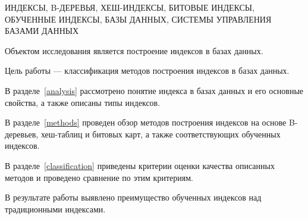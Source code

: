 \begin{essay}{}
    \noindent\mbox{ИНДЕКСЫ,} \mbox{B-ДЕРЕВЬЯ,} \mbox{ХЕШ-ИНДЕКСЫ,}
    \mbox{БИТОВЫЕ} \mbox{ИНДЕКСЫ,} \mbox{ОБУЧЕННЫЕ} \mbox{ИНДЕКСЫ,} \mbox{БАЗЫ}
    \mbox{ДАННЫХ,} \mbox{СИСТЕМЫ} \mbox{УПРАВЛЕНИЯ} \mbox{БАЗАМИ} \mbox{ДАННЫХ}

    Объектом исследования является построение индексов в базах данных.

    Цель работы --- классификация методов построения индексов в базах данных.

    В разделе~\ref{analysis} рассмотрено понятие индекса в базах данных и его
    основные свойства, а также описаны типы индексов.

    В разделе~\ref{methods} проведен обзор методов построения индексов на основе
    B-деревьев, хеш-таблиц и битовых карт, а также соответствующих обученных
    индексов.

    В разделе~\ref{classification} приведены критерии оценки качества описанных
    методов и проведено сравнение по этим критериям.

    В результате работы выявлено преимущество обученных индексов над
    традиционными индексами.

\end{essay}
